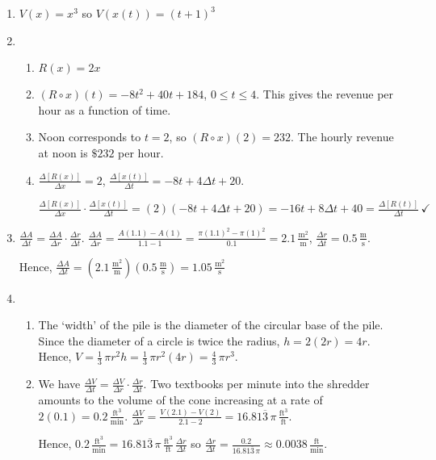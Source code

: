 \documentclass{ximera}
\begin{document}
\begin{enumerate}
\setcounter{enumi}{\value{HW}}

\item $V(x) = x^{3}$ so $V(x(t)) = (t + 1)^{3}$

\item  \begin{enumerate}

\item  $R(x) = 2x$

\item  $\left(R \circ x \right)(t) =  -8t^2+40t+184$, $0 \leq t \leq 4$.  This gives the revenue per hour as a function of time.

\item  Noon corresponds to $t=2$, so $\left(R \circ x \right)(2) = 232$.  The hourly revenue at noon is $\$232$ per hour. 

\item $\frac{\Delta[R(x)]}{\Delta x} = 2$,  $\frac{\Delta[x(t)]}{\Delta t} = -8t + 4 \Delta t + 20$.   

 $\frac{\Delta[R(x)]}{\Delta x} \cdot \frac{\Delta[x(t)]}{\Delta t} = (2)(-8t + 4 \Delta t + 20) =   -16t + 8 \Delta t + 40 = \frac{\Delta[R(t)]}{\Delta t} \, \checkmark$
\end{enumerate}

\item  $\frac{\Delta A}{\Delta t} = \frac{\Delta A}{\Delta r} \cdot \frac{\Delta r}{\Delta t}$.  $\frac{\Delta A}{\Delta r} = \frac{A(1.1) - A(1)}{1.1-1} = \frac{\pi (1.1)^2 - \pi (1)^2}{0.1} = 2.1 \, \frac{\text{m}^2}{\text{m}}$,  $\frac{\Delta r}{\Delta t} = 0.5 \, \frac{\text{m}}{\text{s}}$.

Hence,  $\frac{\Delta A}{\Delta t} = \left( 2.1 \, \frac{\text{m}^2}{\text{m}} \right) \left(0.5 \, \frac{\text{m}}{\text{s}} \right) = 1.05 \,  \frac{\text{m}^2}{\text{s}}$

\item  \begin{enumerate}  \item  The `width' of the pile is the diameter of the circular base of the pile.  Since the diameter of a circle is twice the radius,  $h = 2 (2r) = 4r$.  Hence, $V = \frac{1}{3} \, \pi r^2 h = \frac{1}{3} \, \pi r^2 (4r) = \frac{4}{3} \, \pi r^3$.

\item  We have $\frac{\Delta V}{\Delta t} = \frac{\Delta V}{ \Delta r} \cdot \frac{\Delta r}{\Delta t}$.    Two textbooks per minute into the shredder amounts to the volume of the cone increasing at a rate of $2(0.1) = 0.2 \, \frac{\text{ft}^3}{\text{min}}$.  $\frac{\Delta V}{\Delta r}= \frac{V(2.1) - V(2)}{2.1 - 2} = 16.81\overline{3}  \, \pi \, \frac{\text{ft}^3}{\text{ft}}$.

Hence, $0.2 \, \frac{\text{ft}^3}{\text{min}} = 16.81\overline{3} \, \pi \, \frac{\text{ft}^3}{\text{ft}} \, \frac{\Delta r}{\Delta t}$ so $\frac{\Delta r}{\Delta t} = \frac{0.2}{ 16.81\overline{3} \, \pi }  \approx 0.0038 \, \frac{\text{ft}}{\text{min}}$.



\end{enumerate}

\end{enumerate}
\end{document}

